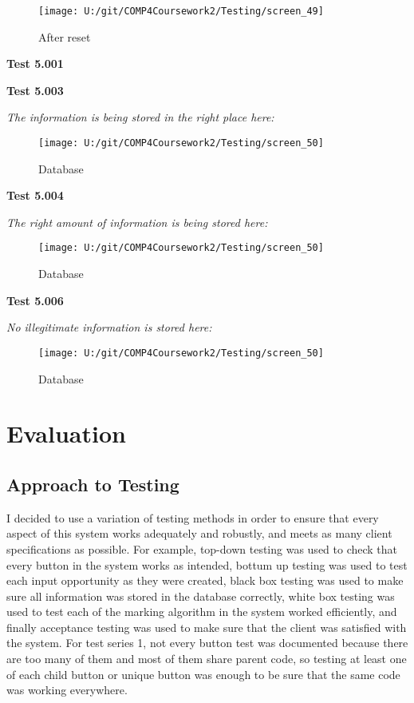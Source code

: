 \begin{figure}[H]
    \label{fig: Second Screen}\caption{After reset}
    \texttt{[image: U:/git/COMP4Coursework2/Testing/screen\_49]}
\end{figure}

\textbf{Test 5.001}

\textbf{Test 5.003}

\textit{The information is being stored in the right place here: }

\begin{figure}[H]
    \label{fig: Second Screen}\caption{Database}
    \texttt{[image: U:/git/COMP4Coursework2/Testing/screen\_50]}
\end{figure}

\textbf{Test 5.004}

\textit{The right amount of information is being stored here: }

\begin{figure}[H]
    \label{fig: Second Screen}\caption{Database}
    \texttt{[image: U:/git/COMP4Coursework2/Testing/screen\_50]}
\end{figure}

\textbf{Test 5.006}

\textit{No illegitimate information is stored here: }

\begin{figure}[H]
    \label{fig: Second Screen}\caption{Database}
    \texttt{[image: U:/git/COMP4Coursework2/Testing/screen\_50]}
\end{figure}

\section{Evaluation}

\subsection{Approach to Testing}

I decided to use a variation of testing methods in order to ensure that every aspect of this system works adequately and robustly, and meets as many client specifications as possible. For example, top-down testing was used to check that every button in the system works as intended, bottum up testing was used to test each input opportunity as they were created, black box testing was used to make sure all information was stored in the database correctly, white box testing was used to test each of the marking algorithm in the system worked efficiently, and finally acceptance testing was used to make sure that the client was satisfied with the system. For test series 1, not every button test was documented because there are too many of them and most of them share parent code, so testing at least one of each child button or unique button was enough to be sure that the same code was working everywhere.

